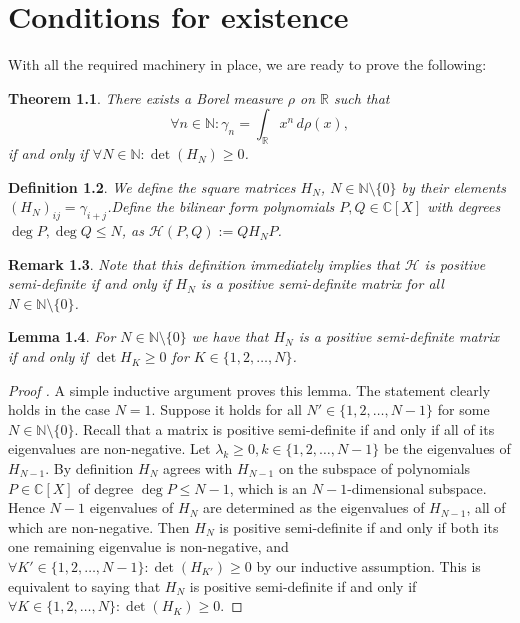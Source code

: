 \documentclass[12pt,oneside]{report}
\newtheorem{thm}{Theorem}[chapter]
\newtheorem{lem}[thm]{Lemma}
\newtheorem{defn}[thm]{Definition}
\newtheorem{rem}[thm]{Remark}
\begin{document}
\chapter{Conditions for existence}\label{ch7}

With all the required machinery in place, we are ready to prove the following:

\begin{thm}\label{existence}
    There exists a Borel measure $\rho$ on $\mathbb{R}$ such that
    $$\forall n \in \mathbb{N}: \gamma_{n} = \int _{\mathbb{R}} x^{n} \, d\rho(x),$$
    if and only if $\forall N \in \mathbb{N}: \det(H_{N}) \geq 0$.
\end{thm}

\begin{defn}
    We define the square matrices $H_{N}$, $N \in \mathbb{N} \setminus \{ 0 \}$ by their elements $(H_{N})_{ij} = \gamma_{i+j}$.Define the bilinear form polynomials $P, Q \in \mathbb{C}[X]$ with degrees $\deg P, \deg Q \leq N$, as $\mathcal{H}(P,Q) := QH_{N}P$.
\end{defn}

\begin{rem}
    Note that this definition immediately implies that $\mathcal{H}$ is positive semi-definite if and only if $H_{N}$ is a positive semi-definite matrix for all $N \in \mathbb{N} \setminus \{ 0 \}$.
\end{rem}

\begin{lem}
    For $N \in \mathbb{N} \setminus \{ 0 \}$ we have that $H_{N}$ is a positive semi-definite matrix if and only if $\det H_{K} \geq 0$ for $K \in \{ 1, 2, \dots, N \}$.
\end{lem}
\begin{proof}[Proof \cite{simon_classical_1998}]
    A simple inductive argument proves this lemma. The statement clearly holds in the case $N = 1$. Suppose it holds for all $N' \in \{ 1,2,\dots,N-1 \}$ for some $N \in \mathbb{N} \setminus \{ 0 \}$. Recall that a matrix is positive semi-definite if and only if all of its eigenvalues are non-negative. Let $\lambda_{k} \geq 0, k \in \{ 1,2,\dots,N-1 \}$ be the eigenvalues of $H_{N-1}$. By definition $H_{N}$ agrees with $H_{N-1}$ on the subspace of polynomials $P \in \mathbb{C}[X]$ of degree $\deg P \leq N-1$, which is an $N-1$-dimensional subspace. Hence $N-1$ eigenvalues of $H_{N}$ are determined as the eigenvalues of $H_{N-1}$, all of which are non-negative. Then $H_{N}$ is positive semi-definite if and only if both its one remaining eigenvalue is non-negative, and $\forall K' \in \{ 1,2,\dots,N-1 \}: \det (H_{K'}) \geq 0$ by our inductive assumption. This is equivalent to saying that $H_{N}$ is positive semi-definite if and only if $\forall K \in \{ 1,2,\dots,N \}: \det(H_{K}) \geq 0$.
\end{proof}
\end{document}
